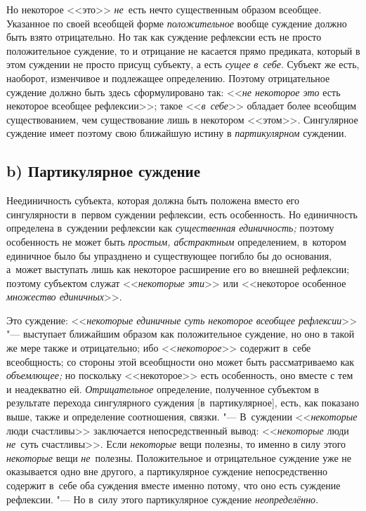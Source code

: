 Но некоторое <<это>> {\em не}~есть нечто существенным образом всеобщее.
Указанное по своей всеобщей форме {\em положительное}
вообще суждение должно быть взято отрицательно. Но так как
суждение рефлексии есть не просто положительное суждение, то и отрицание не
касается прямо предиката, который в этом суждении не просто присущ
субъекту, а есть {\em сущее в~себе}.
Субъект же есть, наоборот, изменчивое и подлежащее
определению. Поэтому отрицательное суждение должно быть здесь
сформулировано так: <<{\em не некоторое это} есть некоторое всеобщее
рефлексии>>; такое <<{\em в~себе}>>
обладает более всеобщим существованием, чем существование
лишь в некотором <<этом>>. Сингулярное суждение имеет поэтому свою ближайшую
истину в {\em партикулярном} суждении.

\subsection[b) Партикулярное суждение]{b) Партикулярное суждение}

Неединичность субъекта, которая должна быть положена вместо его сингулярности
в~первом суждении рефлексии, есть особенность. Но единичность определена
в~суждении рефлексии как {\em существенная единичность;} поэтому особенность не
может быть {\em простым, абстрактным} определением, в~котором единичное
было бы упразднено и существующее погибло бы до основания, а~может выступать
лишь как некоторое расширение его во внешней рефлексии; поэтому субъектом
служат <<{\em некоторые эти}>> или <<некоторое особенное
{\em множество единичных}>>.

Это суждение: <<{\em некоторые единичные суть некоторое всеобщее рефлексии}>>
"--- выступает ближайшим образом как положительное суждение, но оно в такой же
мере также и отрицательно; ибо <<{\em некоторое}>> содержит в~себе всеобщность;
со стороны этой всеобщности оно может быть рассматриваемо как {\em объемлющее;}
но поскольку <<некоторое>> есть особенность, оно вместе с тем и неадекватно ей.
{\em Отрицательное} определение, полученное субъектом в результате перехода
сингулярного суждения [в~партикулярное], есть, как показано выше, также и
определение соотношения, связки. "--- В~суждении <<{\em некоторые} люди
счастливы>> заключается непосредственный вывод: <<{\em некоторые} люди
{\em не}~суть счастливы>>. Если {\em некоторые} вещи полезны, то именно в силу
этого {\em некоторые} вещи {\em не}~полезны. Положительное и отрицательное
суждение уже не оказывается одно вне другого, а партикулярное суждение
непосредственно содержит в~себе оба суждения вместе именно потому, что
оно есть суждение рефлексии. "--- Но в~силу этого партикулярное суждение
{\em неопределённо}.

